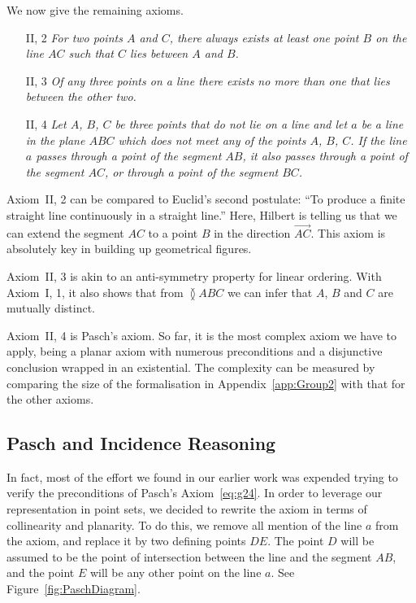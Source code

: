We now give the remaining axioms.
\begin{enumerate}
  \item[II, 2] \emph{For two points $A$ and $C$, there always exists at least one point $B$ on the line $AC$ such that $C$ lies between $A$ and $B$.}
  \item[II, 3] \emph{Of any three points on a line there exists no more than one that lies between the other two.}
  \item[II, 4] \emph{Let $A$, $B$, $C$ be three points that do not lie on a line and let $a$ be a line in the plane $ABC$ which does not meet any of the points $A$, $B$, $C$. If the line $a$ passes through a point of the segment $AB$, it also passes through a point of the segment $AC$, or through a point of the segment $BC$.}
\end{enumerate}

Axiom~II, 2 can be compared to Euclid's second postulate: ``To produce a finite straight line continuously in a straight line.'' Here, Hilbert is telling us that we can extend the segment $AC$ to a point $B$ in the direction $\overrightarrow{AC}$. This axiom is absolutely key in building up geometrical figures.

Axiom~II, 3 is akin to an anti-symmetry property for linear ordering. With Axiom~I, 1, it also shows that from $\between{A}{B}{C}$ we can infer that $A$, $B$ and $C$ are mutually distinct. 

Axiom~II, 4 is Pasch's axiom. So far, it is the most complex axiom we have to apply, being a planar axiom with numerous preconditions and a disjunctive conclusion wrapped in an existential. The complexity can be measured by comparing the size of the formalisation in Appendix~\ref{app:Group2} with that for the other axioms.

\subsection{Pasch and Incidence Reasoning}
In fact, most of the effort we found in our earlier work was expended trying to verify the preconditions of Pasch's Axiom~\eqref{eq:g24}. In order to leverage our representation in point sets, we decided to rewrite the axiom in terms of collinearity and planarity. To do this, we remove all mention of the line $a$ from the axiom, and replace it by two defining points $DE$. The point $D$ will be assumed to be the point of intersection between the line and the segment $AB$, and the point $E$ will be any other point on the line $a$. See Figure~\ref{fig:PaschDiagram}.

